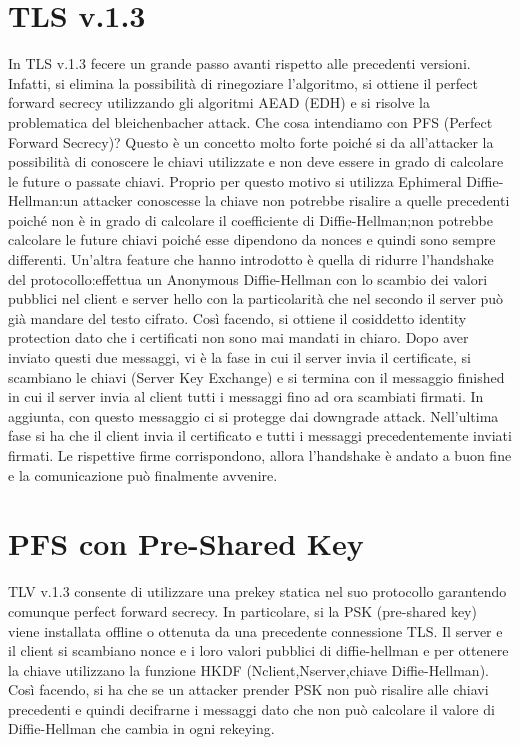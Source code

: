 \documentclass[a4paper,draft]{article}
\begin{document}
\section{TLS v.1.3}
In TLS v.1.3 fecere un grande passo avanti rispetto alle precedenti versioni\@. Infatti, si elimina la possibilità di rinegoziare l'algoritmo, si ottiene il perfect forward secrecy utilizzando gli algoritmi AEAD (EDH) e si risolve la problematica del bleichenbacher attack\@.\newline
Che cosa intendiamo con PFS (Perfect Forward Secrecy)? Questo è un concetto molto forte poiché si da all'attacker la possibilità di conoscere le chiavi utilizzate e non deve essere in grado di calcolare le future o passate chiavi\@.
Proprio per questo motivo si utilizza Ephimeral Diffie-Hellman:\@se un attacker conoscesse la chiave non potrebbe risalire a quelle precedenti poiché non è in grado di calcolare il coefficiente di Diffie-Hellman;\@similmente non potrebbe calcolare le future chiavi poiché esse dipendono da nonces e quindi sono sempre differenti\@.\newline
Un'altra feature che hanno introdotto è quella di ridurre l'handshake del protocollo:\@si effettua un Anonymous Diffie-Hellman con lo scambio dei valori pubblici nel client e server hello con la particolarità che nel secondo il server può già mandare del testo cifrato\@. Così facendo, si ottiene il cosiddetto identity protection dato che i certificati non sono mai mandati in chiaro\@.\newline
Dopo aver inviato questi due messaggi, vi è la fase in cui il server invia il certificate, si scambiano le chiavi (Server Key Exchange) e si termina con il messaggio finished in cui il server invia al client tutti i messaggi fino ad ora scambiati firmati\@. In aggiunta, con questo messaggio ci si protegge dai downgrade attack\@.
Nell'ultima fase si ha che il client invia il certificato e tutti i messaggi precedentemente inviati firmati\@. Le rispettive firme corrispondono, allora l'handshake è andato a buon fine e la comunicazione può finalmente avvenire\@.
\section{PFS con Pre-Shared Key}
TLV v.1.3 consente di utilizzare una prekey statica nel suo protocollo garantendo comunque perfect forward secrecy\@. In particolare, si la PSK (pre-shared key) viene installata offline o ottenuta da una precedente connessione TLS\@.
Il server e il client si scambiano nonce e i loro valori pubblici di diffie-hellman e per ottenere la chiave utilizzano la funzione HKDF (Nclient,Nserver,chiave Diffie-Hellman)\@.\newline
Così facendo, si ha che se un attacker prender PSK non può risalire alle chiavi precedenti e quindi decifrarne i messaggi dato che non può calcolare il valore di Diffie-Hellman che cambia in ogni rekeying\@.
\end{document}
